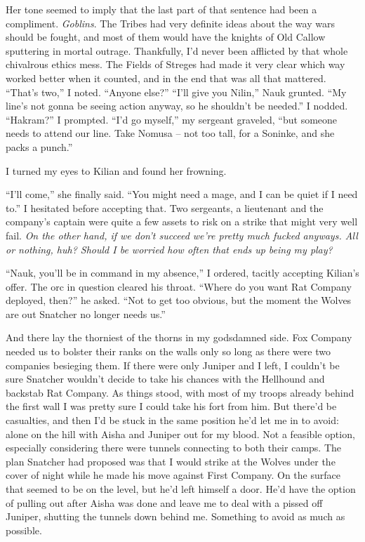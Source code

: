\documentclass[12pt, openany]{book}
\begin{document}
Her tone seemed to imply that the last part of that sentence had been a compliment. \textit{Goblins}. The Tribes had very definite ideas about the way wars should be fought, and most of them would have the knights of Old Callow sputtering in mortal outrage. Thankfully, I’d never been afflicted by that whole chivalrous ethics mess. The Fields of Streges had made it very clear which way worked better when it counted, and in the end that was all that mattered.
“That’s two,” I noted. “Anyone else?”
“I’ll give you Nilin,” Nauk grunted. “My line’s not gonna be seeing action anyway, so he shouldn’t be needed.”
I nodded.
“Hakram?” I prompted.
“I’d go myself,” my sergeant graveled, “but someone needs to attend our line. Take Nomusa – not too tall, for a Soninke, and she packs a punch.”

I turned my eyes to Kilian and found her frowning.

“I’ll come,” she finally said. “You might need a mage, and I can be quiet if I need to.”
I hesitated before accepting that. Two sergeants, a lieutenant and the company’s captain were quite a few assets to risk on a strike that might very well fail. \textit{On the other hand, if we don’t succeed we’re pretty much fucked anyways. All or nothing, huh? Should I be worried how often that ends up being my play?}

“Nauk, you’ll be in command in my absence,” I ordered, tacitly accepting Kilian’s offer.
The orc in question cleared his throat. “Where do you want Rat Company deployed, then?” he asked. “Not to get too obvious, but the moment the Wolves are out Snatcher no longer needs us.”

And there lay the thorniest of the thorns in my godsdamned side. Fox Company needed us to bolster their ranks on the walls only so long as there were two companies besieging them. If there were only Juniper and I left, I couldn’t be sure Snatcher wouldn’t decide to take his chances with the Hellhound and backstab Rat Company. As things stood, with most of my troops already behind the first wall I was pretty sure I could take his fort from him. But there’d be casualties, and then I’d be stuck in the same position he’d let me in to avoid: alone on the hill with Aisha and Juniper out for my blood. Not a feasible option, especially considering there were tunnels connecting to both their camps. The plan Snatcher had proposed was that I would strike at the Wolves under the cover of night while he made his move against First Company. On the surface that seemed to be on the level, but he’d left himself a door. He’d have the option of pulling out after Aisha was done and leave me to deal with a pissed off Juniper, shutting the tunnels down behind me. Something to avoid as much as possible.
\end{document}
